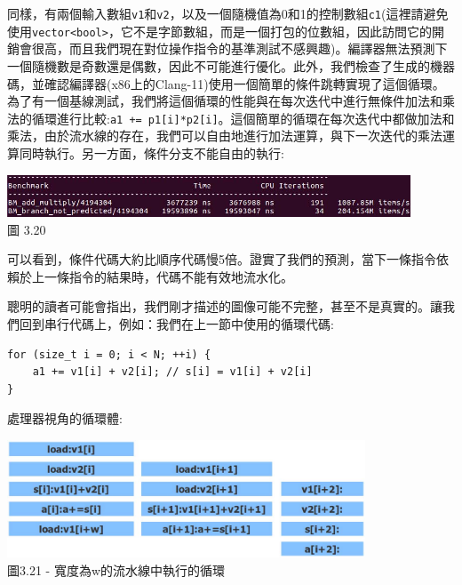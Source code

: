 同樣，有兩個輸入數組\texttt{v1}和\texttt{v2}，以及一個隨機值為0和1的控制數組\texttt{c1}(這裡請避免使用\texttt{vector<bool>}，它不是字節數組，而是一個打包的位數組，因此訪問它的開銷會很高，而且我們現在對位操作指令的基準測試不感興趣)。編譯器無法預測下一個隨機數是奇數還是偶數，因此不可能進行優化。此外，我們檢查了生成的機器碼，並確認編譯器(x86上的Clang-11)使用一個簡單的條件跳轉實現了這個循環。為了有一個基線測試，我們將這個循環的性能與在每次迭代中進行無條件加法和乘法的循環進行比較:\texttt{a1 += p1[i]*p2[i]}。這個簡單的循環在每次迭代中都做加法和乘法，由於流水線的存在，我們可以自由地進行加法運算，與下一次迭代的乘法運算同時執行。另一方面，條件分支不能自由的執行:

\begin{center}
\includegraphics[width=0.9\textwidth]{content/1/chapter3/images/20.jpg}\\
圖 3.20
\end{center}

可以看到，條件代碼大約比順序代碼慢5倍。證實了我們的預測，當下一條指令依賴於上一條指令的結果時，代碼不能有效地流水化。


聰明的讀者可能會指出，我們剛才描述的圖像可能不完整，甚至不是真實的。讓我們回到串行代碼上，例如：我們在上一節中使用的循環代碼:

\begin{lstlisting}[style=styleCXX]
for (size_t i = 0; i < N; ++i) {
	a1 += v1[i] + v2[i]; // s[i] = v1[i] + v2[i]
}
\end{lstlisting}

處理器視角的循環體:

\begin{center}
\includegraphics[width=0.8\textwidth]{content/1/chapter3/images/21.jpg}\\
圖3.21 - 寬度為w的流水線中執行的循環
\end{center}

